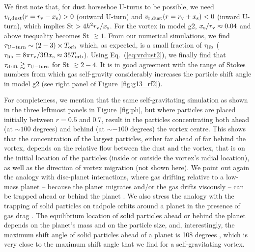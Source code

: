 \documentclass[a4paper,usenatbib]{mnras}
\begin{document}
We first note that, for dust horseshoe U-turns to be possible, we need
$v_{\rm r,dust}(r = r_{\rm v} - x_{\rm s}) > 0$ (outward U-turn) and
$v_{\rm r,dust}(r = r_{\rm v} + x_{\rm s}) < 0$ (inward U-turn), which
implies ${\rm St} > 4h^2 r_{\rm v}/x_{\rm s}$.  For the vortex in
model g2, $x_{\rm s} / r_{\rm v} \approx 0.04$ and above inequality
becomes St $\gtrsim 1$. From our numerical simulations, we find
$\tau_{\rm U-turn} \sim (2-3)\times T_{\rm orb}$
which, as expected, is a small fraction of $\tau_{\rm lib}$
($\tau_{\rm lib} = 8\pi r_{\rm v} / 3\Omega x_{\rm s} \approx 35
T_{\rm orb}$). Using Eq.~(\ref{eq:vrdust2}), we finally find that
$\tau_{\rm drift} \gtrsim \tau_{\rm U-turn}$ for St $\gtrsim 2-4$. It
is in good agreement with the range of Stokes numbers from which gas
self-gravity considerably increases the particle shift angle in model
g2 (see right panel of Figure~\ref{fig:g13_rf2}).

For completeness, we mention that the same self-gravitating simulation
as shown in the three leftmost panels in Figure~\ref{fig:ph}, but
where particles are placed initially between $r=0.5$ and 0.7, result
in the particles concentrating both ahead (at $\sim$$100$ degrees) and
behind (at $\sim$$-100$ degrees) the vortex centre. This shows that
the concentration of the largest particles, either far ahead of far
behind the vortex, depends on the relative flow between the dust and
the vortex, that is on the initial location of the particles (inside
or outside the vortex's radial location), as well as the direction of
vortex migration (not shown here). We point out again the analogy with
disc-planet interactions, where gas drifting relative to a low-mass
planet -- because the planet migrates and/or the gas drifts viscously
-- can be trapped ahead or behind the planet \citep{masset02, SJP14,
  Pierens15}. We also stress the analogy with the
  trapping of solid particles on tadpole orbits around a planet in the
  presence of gas drag \citep[e.g.,][]{Peale93, Lyra09}. The
  equilibrium location of solid particles ahead or behind the planet
  depends on the planet's mass and on the particle size, and,
  interestingly, the maximum shift angle of solid particles ahead of a
  planet is 108 degrees \citep{Peale93}, which is very close to the
  maximum shift angle that we find for a self-gravitating vortex.
  
\end{document}
